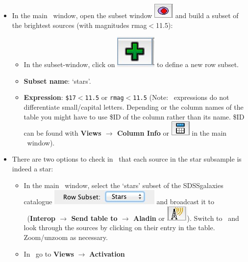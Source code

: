 \documentclass [a4paper, 12pt]{article}
\begin{document}
\begin{itemize}
\item In the main \topcat\ window, open the subset window
\includegraphics[width=0.04  \textwidth]{../images/topcat_button_subset.jpg}
and build a subset of the brightest sources (with magnitudes rmag$<$11.5):
\begin{itemize}
    \item In the subset-window, click on \includegraphics[width=0.04
    \textwidth]{../images/topcat_button_add.jpg}  to define a new row subset.
    \item \textbf{Subset name}: `stars'.
    \item \textbf{Expression}: \texttt{\$17$<$11.5} or \texttt{rmag$<$11.5}
    (Note: \topcat\ expressions
    do not differentiate small/capital letters. Depending or the column names
    of the table you might have to use \$ID of the column rather than its name.
    \$ID can be found with \textbf{Views $\rightarrow$ Column Info} or
    \includegraphics[width=0.04
    \textwidth]{../images/topcat_button_metadata.jpg} in
    the main \topcat\ window).
\end{itemize}
\item There are two options to check in \aladin\ that each source in the star
subsample is indeed a star:
\begin{itemize}
    \item In the main \topcat\ window, select the `stars' subset of the
    SDSSgalaxies catalogue  \includegraphics[width=0.2
    \textwidth]{../images/topcat_dropdown-menu_subsets.jpg} and broadcast it to
    \aladin\
    (\textbf{Interop $\rightarrow$ Send table to $\rightarrow$ Aladin} or
    \includegraphics[width=0.04
    \textwidth]{../images/topcat_button_broadcast.jpg}). Switch to
    \aladin\ and look through the sources by clicking on their entry in the
    table. Zoom/unzoom as necessary.
    \item In \topcat\ go to \textbf{Views} $\rightarrow$ \textbf{Activation
}
\end{itemize}
\end{itemize}
\end{document}

